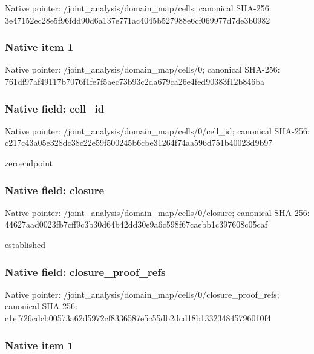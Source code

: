 \documentclass[10pt,a4paper]{article}
\begin{document}
Native pointer: /joint\_analysis/domain\_map/cells; canonical SHA-256: 3e47152ec28e5f96fdd90d6a\allowbreak{}137e771ac4045b527988e6cf\allowbreak{}069977d7de3b0982



\subsubsection{Native item 1}


Native pointer: /joint\_analysis/domain\_map/cells/0; canonical SHA-256: 761df97af49117b7076f1fe7\allowbreak{}f5aec73b93c2da679ca26e4f\allowbreak{}ed90383f12b846ba



\subsubsection{Native field: cell\_id}


Native pointer: /joint\_analysis/domain\_m\allowbreak{}ap/cells/0/cell\_id; canonical SHA-256: c217c43a05e328dc38c22e59\allowbreak{}f500245b6cbe31264f74aa59\allowbreak{}6d751b40023d9b97


zeroendpoint


\subsubsection{Native field: closure}


Native pointer: /joint\_analysis/domain\_m\allowbreak{}ap/cells/0/closure; canonical SHA-256: 44627aad0023fb7cff9c3b30\allowbreak{}d64b42dd30e9a6c598f67cae\allowbreak{}bb1c397608c05caf


established


\subsubsection{Native field: closure\_proof\_refs}


Native pointer: /joint\_analysis/domain\_m\allowbreak{}ap/cells/0/closure\_proof\allowbreak{}\_refs; canonical SHA-256: c1ef726cdcb00573a62d5972\allowbreak{}cf8336587e5c55db2dcd18b1\allowbreak{}33234845796010f4



\subsubsection{Native item 1}
\end{document}
